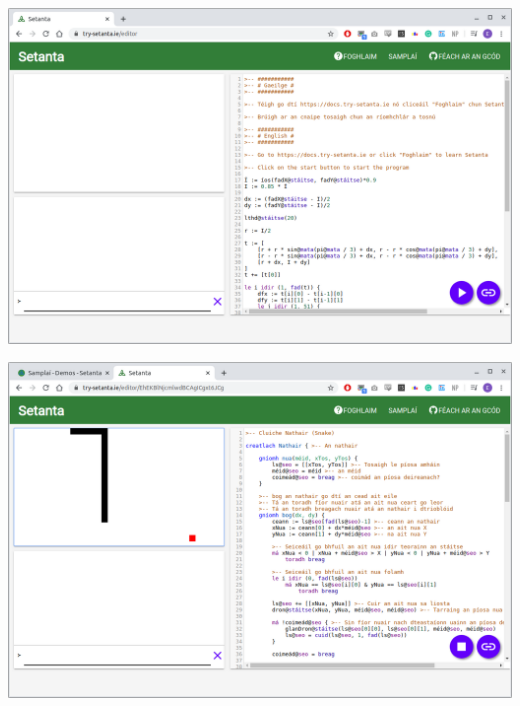 \begin{center}
    \includegraphics[scale=0.38]{app4assets/editor-desktop}
    \label{screenshot:editor-desktop}
\end{center}

\begin{center}
    \includegraphics[scale=0.38]{app4assets/snake-desktop}
    \label{screenshot:snake-desktop}
\end{center}

